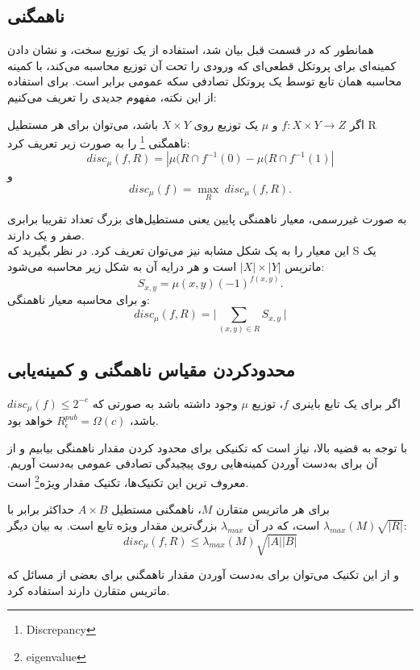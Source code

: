 \subsection{ناهمگنی}
همانطور که در قسمت قبل بیان شد، استفاده از یک توزیع سخت، و نشان دادن کمینه‌ای برای پروتکل قطعی‌ای که ورودی را تحت آن توزیع محاسبه می‌کند، با کمینه محاسبه همان تابع توسط یک پروتکل تصادفی سکه عمومی برابر است. برای استفاده از این نکته، مفهوم جدیدی را تعریف می‌کنیم:
\begin{definition}
اگر  $f : X \times Y \rightarrow Z$ و $\mu$ یک توزیع روی $X \times Y$ باشد، می‌توان برای هر مستطیل R ناهمگنی
\footnote{Discrepancy}
را به صورت زیر تعریف کرد:
\begin{equation}
disc_\mu (f,R) = |\mu (R \cap f^{-1}(0) - \mu (R \cap f^{-1}(1)|
\end{equation}
و
\begin{equation}
disc_\mu (f) = \max_R \ disc_\mu (f,R).
\end{equation}
\end{definition}
به صورت غیررسمی، معیار ناهمنگی پایین یعنی مستطیل‌های بزرگ تعداد تقریبا برابری صفر و یک دارند. \\
این معیار را به یک شکل مشابه نیز می‌توان تعریف کرد.
در نظر بگیرید که S یک ماتریس $|X| \times |Y|$ است و هر درایه آن به شکل زیر محاسبه می‌شود:
\begin{equation*}
S_{x, y} = \mu(x,y)(-1)^{f(x,y)}.
\end{equation*}
و برای محاسبه معیار ناهمنگی:
\begin{equation}
disc_\mu (f,R) = \Bigg|\sum_{(x,y) \in R} S_{x,y}\ \Bigg|
\end{equation}

\subsection{محدودکردن مقیاس ناهمگنی و کمینه‌یابی}
\begin{theorem}
اگر برای یک تابع باینری $f$، توزیع $\mu$ وجود داشته باشد به صورتی که $disc_\mu (f) \leq 2^{-c}$ باشد، $R^{pub}_\epsilon = \Omega(c)$ خواهد بود.
\end{theorem}
با توجه به قضیه بالا، نیاز است که تکنیکی برای محدود کردن مقدار ناهمنگی بیابیم و از آن برای به‌دست آوردن کمینه‌هایی روی پیچیدگی تصادفی عمومی به‌دست آوریم. معروف ترین این تکنیک‌ها‌، تکنیک مقدار ویژه\footnote{eigenvalue} است.

\begin{lemma}
برای هر ماتریس متقارن $M$، ناهمگنی مستطیل $A \times B$ حداکثر برابر با $\lambda_{max} (M) \sqrt{|R|}$ است، که در آن $\lambda_{max}$ بزرگ‌ترین مقدار ویژه تابع است. به بیان دیگر:
\begin{equation}
disc_\mu(f, R) \leq \lambda_{max} (M) \sqrt{|A||B|}
\end{equation}
\end{lemma}
و از این تکنیک می‌توان برای به‌‌دست آوردن مقدار ناهمگنی برای بعضی از مسائل که ماتریس متقارن دارند استفاده کرد.